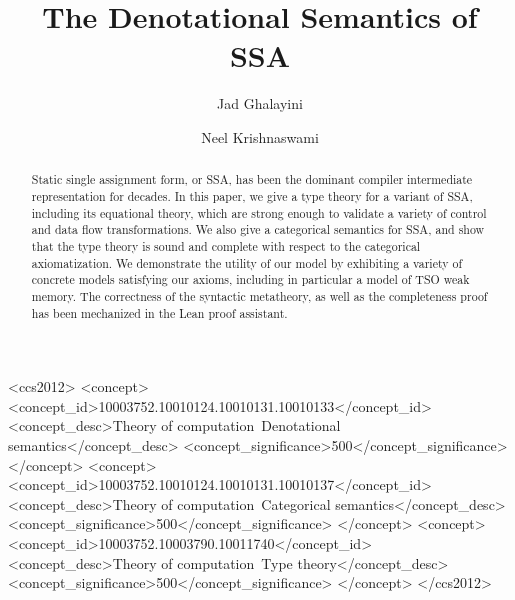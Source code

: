 \documentclass[acmsmall,screen,review]{acmart}
\begin{document}
\title{The Denotational Semantics of SSA}

\author{Jad Ghalayini}

\author{Neel Krishnaswami}

\begin{abstract}
  Static single assignment form, or SSA, has been the dominant
  compiler intermediate representation for decades. In this paper, we
  give a type theory for a variant of SSA, including its equational
  theory, which are strong enough to validate a variety of control and
  data flow transformations. We also give a categorical semantics for
  SSA, and show that the type theory is sound and complete with
  respect to the categorical axiomatization. We demonstrate the
  utility of our model by exhibiting a variety of concrete models
  satisfying our axioms, including in particular a model of TSO weak
  memory. The correctness of the syntactic metatheory, as well as the
  completeness proof has been mechanized in the Lean proof assistant.
\end{abstract}

\begin{CCSXML}
  <ccs2012>
  <concept>
  <concept_id>10003752.10010124.10010131.10010133</concept_id>
  <concept_desc>Theory of computation~Denotational semantics</concept_desc>
  <concept_significance>500</concept_significance>
  </concept>
  <concept>
  <concept_id>10003752.10010124.10010131.10010137</concept_id>
  <concept_desc>Theory of computation~Categorical semantics</concept_desc>
  <concept_significance>500</concept_significance>
  </concept>
  <concept>
  <concept_id>10003752.10003790.10011740</concept_id>
  <concept_desc>Theory of computation~Type theory</concept_desc>
  <concept_significance>500</concept_significance>
  </concept>
  </ccs2012>
\end{CCSXML}



\end{document}
